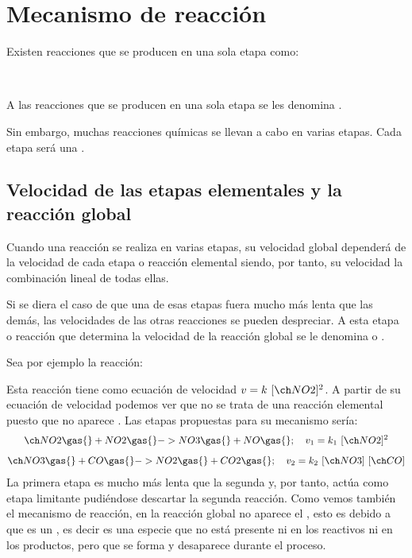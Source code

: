 \section{Mecanismo de reacción}\label{sec:mecanismo-de-reaccion}

Existen reacciones que se producen en una sola etapa como:
\begin{center}
    \\
\end{center}

A las reacciones que se producen en una sola etapa se les denomina .

Sin embargo, muchas reacciones químicas se llevan a cabo en varias etapas.
Cada etapa será una .

\subsection{Velocidad de las etapas elementales y la reacción global}\label{subsec:velocidad-de-las-etapas-elementales-y-la-reaccion-global}
Cuando una reacción se realiza en varias etapas, su velocidad global dependerá de la velocidad de cada etapa o reacción elemental siendo, por tanto, su velocidad la combinación lineal de todas ellas.

Si se diera el caso de que una de esas etapas fuera mucho más lenta que las demás, las velocidades de las otras reacciones se pueden despreciar.
A esta etapa o reacción que determina la velocidad de la reacción global se le denomina  o .

Sea por ejemplo la reacción:
\begin{center}
\end{center}
Esta reacción tiene como ecuación de velocidad $v = k\ [\formula{NO2}]^2$.
A partir de su ecuación de velocidad podemos ver que no se trata de una reacción elemental puesto que no aparece .
Las etapas propuestas para su mecanismo sería:
\begin{gather*}
    \formula{NO2 \gas{} + NO2 \gas{} -> NO3 \gas{} + NO \gas{}};\quad v_1 = k_1\ \conc{NO2}^2\separ
    \formula{NO3 \gas{} + CO \gas{} -> NO2 \gas{} + CO2 \gas{}};\quad v_2 = k_2\ \conc{NO3}\ \conc{CO}
\end{gather*}
La primera etapa es mucho más lenta que la segunda y, por tanto, actúa como etapa limitante pudiéndose descartar la segunda reacción.
Como vemos también el mecanismo de reacción, en la reacción global no aparece el , esto es debido a que es un , es decir es una especie que no está presente ni en los reactivos ni en los productos, pero que se forma y desaparece durante el proceso.

